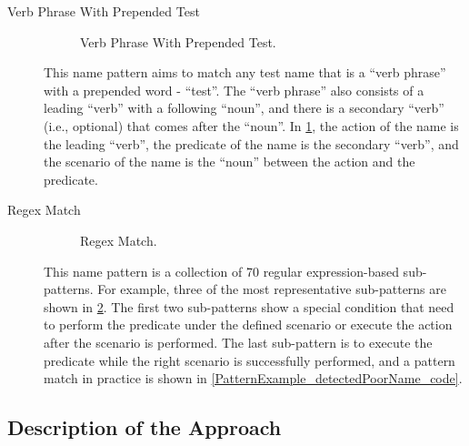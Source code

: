 \begin{description}
\item[Verb Phrase With Prepended Test]

\begin{figure}[H]
\centering
    \begin{subfigure}{0.65\textwidth}
    \end{subfigure}
\caption{Verb Phrase With Prepended Test.}
\label{fig:verb-with-test}
\end{figure}

This name pattern aims to match any test name that is a \enquote{verb phrase} with a prepended word - \enquote{test}.
%
The \enquote{verb phrase} also consists of a leading \enquote{verb} with a following \enquote{noun}, and there is a secondary \enquote{verb} (i.e., optional) that comes after the \enquote{noun}.
%
In \cref{fig:verb-with-test}, the action of the name is the leading \enquote{verb}, the predicate of the name is the secondary \enquote{verb}, and the scenario of the name is the \enquote{noun} between the action and the predicate.

\item[Regex Match]

\begin{figure}[H]
\centering
    \begin{subfigure}{0.675\textwidth}
    \end{subfigure}
\caption{Regex Match.}
\label{fig:regex-match}
\end{figure}

This name pattern is a collection of \num{70} regular expression-based sub-patterns.
%
For example, three of the most representative sub-patterns are shown in \cref{fig:regex-match}.
%
The first two sub-patterns show a special condition that need to perform the predicate under the defined scenario or execute the action after the scenario is performed.
%
The last sub-pattern is to execute the predicate while the right scenario is successfully performed, and a pattern match in practice is shown in \cref{PatternExample_detectedPoorName_code}.

\end{description}


\subsection{Description of the Approach}
\label{sec:approach-pattern}

